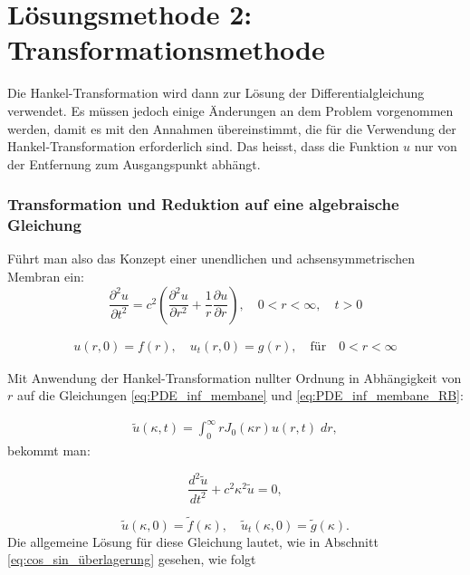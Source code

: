 %
%
%
\section{Lösungsmethode 2: Transformationsmethode
\label{kreismembran:section:teil3}}
Die Hankel-Transformation wird dann zur Lösung der Differentialgleichung verwendet. Es müssen jedoch einige Änderungen an dem Problem vorgenommen werden, damit es mit den Annahmen übereinstimmt, die für die Verwendung der Hankel-Transformation erforderlich sind. Das heisst, dass die Funktion $u$ nur von der Entfernung zum Ausgangspunkt abhängt. 

\subsubsection{Transformation und Reduktion auf eine algebraische Gleichung\label{subsub:transf_reduktion}}
Führt man also das Konzept einer unendlichen und achsensymmetrischen Membran ein:
\begin{equation*}
	\frac{\partial^2u}{\partial t^2}
	=
	c^2  \left(\frac{\partial^2 u}{\partial r^2}
	+
	\frac{1}{r}
	\frac{\partial u}{\partial r} \right), \quad 0<r<\infty, \quad t>0
	\label{eq:PDE_inf_membane}
\end{equation*}

\begin{align}
	u(r,0)=f(r), \quad u_t(r,0) = g(r), \quad \text{für} \quad 0<r<\infty
	\label{eq:PDE_inf_membane_RB}
\end{align}

Mit Anwendung der Hankel-Transformation nullter Ordnung in Abhängigkeit von $r$ auf die Gleichungen \eqref{eq:PDE_inf_membane} und \eqref{eq:PDE_inf_membane_RB}:

\begin{align}
	\tilde{u}(\kappa,t)=\int_{0}^{\infty}r J_0(\kappa r)u(r,t) \; dr,
\end{align}
bekommt man:

\begin{equation*}
	\frac{d^2 \tilde{u}}{dt^2} + c^2\kappa^2\tilde{u}=0,
\end{equation*}

\begin{equation*}
	\tilde{u}(\kappa,0)=\tilde{f}(\kappa), \quad 
	\tilde{u}_t(\kappa,0)=\tilde{g}(\kappa).
\end{equation*}
Die allgemeine Lösung für diese Gleichung lautet, wie in Abschnitt \eqref{eq:cos_sin_überlagerung} gesehen, wie folgt


